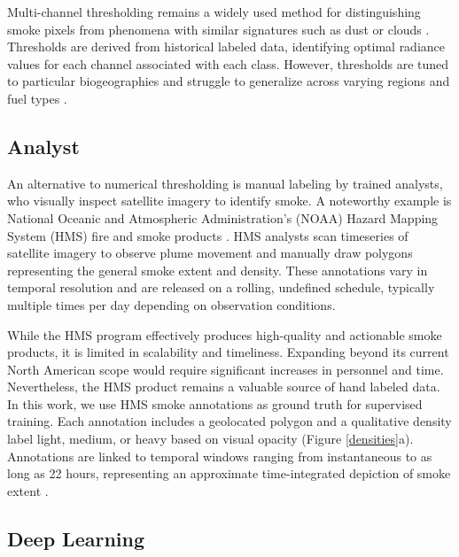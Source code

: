\documentclass{article}
\begin{document}
Multi-channel thresholding remains a widely used method for distinguishing smoke pixels from phenomena with similar signatures such as dust or clouds \cite{threshold}. Thresholds are derived from historical labeled data, identifying optimal radiance values for each channel associated with each class. 
However, thresholds are tuned to particular biogeographies and struggle to generalize across varying regions and fuel types \cite{thresh_geog}.

\subsection{Analyst} 


An alternative to numerical thresholding is manual labeling by trained analysts, who visually inspect satellite imagery to identify smoke. A noteworthy example is National Oceanic and Atmospheric Administration's (NOAA) Hazard Mapping System (HMS) fire and smoke products \cite{hms, hms_val}. HMS analysts scan timeseries of satellite imagery to observe plume movement and manually draw polygons representing the general smoke extent and density. These annotations vary in temporal resolution and are released on a rolling, undefined schedule, typically multiple times per day depending on observation conditions.

While the HMS program effectively produces high-quality and actionable smoke products, it is limited in scalability and timeliness. Expanding beyond its current North American scope would require significant increases in personnel and time. Nevertheless, the HMS product remains a valuable source of hand labeled data. In this work, we use HMS smoke annotations as ground truth for supervised training. Each annotation includes a geolocated polygon and a qualitative density label light, medium, or heavy based on visual opacity (Figure \ref{densities}a). Annotations are linked to temporal windows ranging from instantaneous to as long as 22 hours, representing an approximate time-integrated depiction of smoke extent \cite{hms_web}.

\subsection{Deep Learning}
\end{document}
